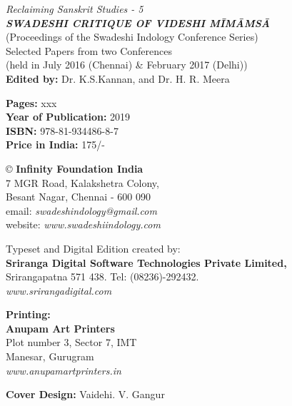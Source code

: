 \thispagestyle{empty}

 \textit{Reclaiming Sanskrit Studies - 5}\\\textbf{\textit{SWADESHI CRITIQUE OF VIDESHI MĪMĀṀSĀ}}\\
 (Proceedings of the Swadeshi Indology Conference Series)\\
 Selected Papers from two Conferences\\
 (held in July 2016 (Chennai) \& February 2017 (Delhi))\\\textbf{Edited by:} Dr. K.S.Kannan, and Dr. H. R. Meera

 \textbf{Pages:} xxx\\\textbf{Year of Publication:} 2019\\\textbf{ISBN:} 978-81-934486-8-7\\\textbf{Price in India:} 175/-

 © \textbf{Infinity Foundation India}\\
 7 MGR Road, Kalakshetra Colony,\\
 Besant Nagar, Chennai - 600 090\\
 email: \textit{swadeshindology@gmail.com}\\
 website: \textit{www.swadeshiindology.com}

 Typeset and Digital Edition created by:\\\textbf{Sriranga Digital Software Technologies Private Limited,}\\
 Srirangapatna 571 438. Tel: (08236)-292432.\\\textit{www.srirangadigital.com}

 \textbf{Printing:}\\\textbf{Anupam Art Printers}\\
 Plot number 3, Sector 7, IMT\\
 Manesar, Gurugram\\\textit{www.anupamartprinters.in}

\textbf{Cover Design:} Vaidehi. V. Gangur

